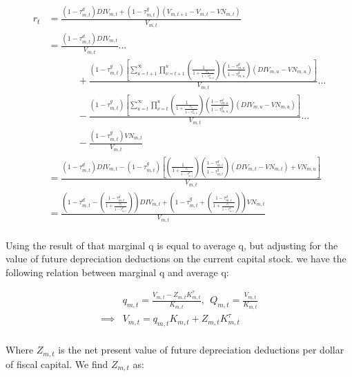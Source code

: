 \documentclass[letterpaper,12pt]{article}
\theoremstyle{definition}
\begin{document}
\begin{spacing}{1.5}
\begin{equation}
\label{eqn:firm_return_tax}
\begin{split}
r_{t} & = \frac{(1-\tau^{d}_{m,t})DIV_{m,t} + (1-\tau^{g}_{m,t})\left(V_{m,t+1}-V_{m,t}-VN_{m,t}\right)}{V_{m,t}}\\
& =  \frac{(1-\tau^{d}_{m,t})DIV_{m,t}}{V_{m,t}}... \\  
& \quad\quad\quad + \frac{(1-\tau^{g}_{m,t})\left[\sum_{u=t+1}^{\infty}\prod_{\nu=t+1}^{u}\left(\frac{1}{1+\frac{r_{\nu}}{1-\tau^{g}_{m,\nu}}}\right)\left(\frac{1-\tau^{d}_{m,u}}{1-\tau^{g}_{m,u}}\right)\left(DIV_{m,u}-VN_{m,u}\right)\right]}{V_{m,t}} ...\\
& \quad\quad\quad- \frac{(1-\tau^{g}_{m,t})\left[\sum_{u=t}^{\infty}\prod_{\nu=t}^{u}\left(\frac{1}{1+\frac{r_{\nu}}{1-\tau^{g}_{m,\nu}}}\right)\left(\frac{1-\tau^{d}_{m,u}}{1-\tau^{g}_{m,u}}\right)\left(DIV_{m,u}-VN_{m,u}\right)\right]}{V_{m,t}}... \\
& \quad\quad\quad - \frac{(1-\tau^{g}_{m,t})VN_{m,t}}{V_{m,t}} \\
& = \frac{(1-\tau^{d}_{m,t})DIV_{m,t} - (1-\tau^{g}_{m,t})\left[\left(\frac{1}{1+\frac{r_{t}}{1-\tau^{g}_{m,t}}}\right)\left(\frac{1-\tau^{d}_{m,t}}{1-\tau^{g}_{m,t}}\right)\left(DIV_{m,t}-VN_{m,t}\right)+VN_{m,u}\right]}{V_{m,t}} \\
& = \frac{\left(1-\tau^{d}_{m,t}-\left(\frac{1-\tau^{d}_{m,t}}{1+\frac{r_{t}}{1-\tau^{g}_{m,t}}}\right)\right)DIV_{m,t} + \left(1-\tau^{g}_{m,t}+\left(\frac{1-\tau^{d}_{m,t}}{1+\frac{r_{t}}{1-\tau^{g}_{m,t}}}\right)\right)VN_{m,t}}{V_{m,t}}  \\
\end{split}
\end{equation}


Using the result of \citet{Hayashi1982} that marginal q is equal to average q, but adjusting for the value of future depreciation deductions on the current capital stock. we have the following relation between marginal q and average q:

\begin{equation}
\begin{split}
&q_{m,t} = \frac{V_{m,t}-Z_{m,t}K^{\tau}_{m,t}}{K_{m,t}}, \ \  Q_{m,t}= \frac{V_{m,t}}{K_{m,t}}  \\
\implies & V_{m,t}=q_{m,t}K_{m,t} + Z_{m,t}K^{\tau}_{m,t}  \\
\end{split}
\end{equation}

Where $Z_{m,t}$ is the net present value of future depreciation deductions per dollar of fiscal capital.  We find $Z_{m,t}$ as:


\end{spacing}
\end{document}
